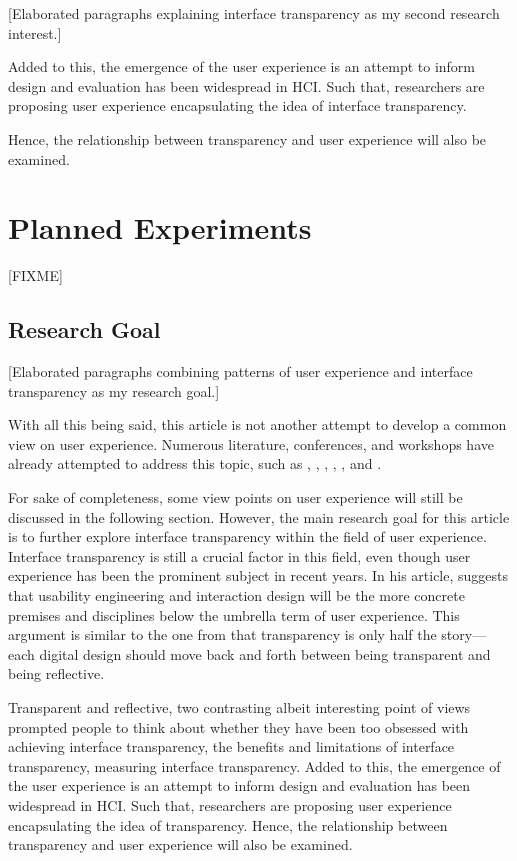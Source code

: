 \documentclass{acm_proc_article-sp}
\begin{document}
[Elaborated paragraphs explaining interface transparency as my second
  research interest.]

Added to this, the emergence of the user experience is an attempt to
inform design and evaluation has been widespread in HCI. Such that,
researchers are proposing user experience encapsulating the idea of
interface transparency.

Hence, the relationship between transparency and user
experience will also be examined.


\section{Planned Experiments}
\label{sec:experiment}
[FIXME]

\subsection{Research Goal}
[Elaborated paragraphs combining patterns of user experience and
  interface transparency as my research goal.]

With all this being said, this article is not another attempt to
develop a common view on user experience. Numerous literature,
conferences, and workshops have already attempted to address this
topic, such as \citet{early:forlizzi}, \citet{emotional:norman},
\citet{action:dourish}, \citet{ux:hassenzahl},
\citet{experience:desmet}, and \citet{ux:law}.

For sake of completeness, some view points on user experience will
still be discussed in the following section. However, the main
research goal for this article is to further explore interface
transparency within the field of user experience. Interface
transparency is still a crucial factor in this field, even though user
experience has been the prominent subject in recent years. In his
article, \citet{future:memmel} suggests that usability engineering and
interaction design will be the more concrete premises and disciplines
below the umbrella term of user experience. This argument is similar
to the one from \citet{windows:bolter} that transparency is only half
the story---each digital design should move back and forth between
being transparent and being reflective.

Transparent and reflective, two contrasting albeit interesting point
of views prompted people to think about whether they have been too
obsessed with achieving interface transparency, the benefits and
limitations of interface transparency, measuring interface
transparency. Added to this, the emergence of the user experience is
an attempt to inform design and evaluation has been widespread in
HCI. Such that, researchers are proposing user experience
encapsulating the idea of transparency. Hence, the relationship
between transparency and user experience will also be examined.
\end{document}
